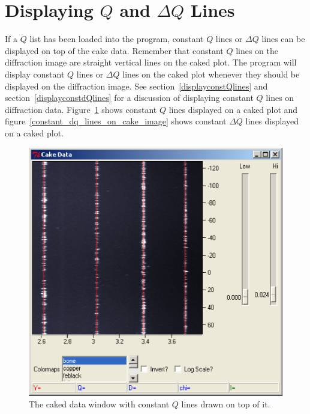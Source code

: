 \section{\texorpdfstring{Displaying $Q$ and $\Delta Q$ Lines}
    {Displaying Q and delta Q Lines}}
    \label{cakeQlinesandpeaks}

If a $Q$ list has been loaded into the program, 
constant $Q$ lines or $\Delta Q$ lines can be 
displayed on top of the cake data. Remember that 
constant $Q$ lines on the diffraction image are straight
vertical lines on the caked plot. 
The program will display constant $Q$ lines or 
$\Delta Q$ lines on the caked plot whenever they 
should be displayed on the diffraction image. See 
section~\ref{displayconstQlines} and 
section~\ref{displayconstdQlines} for a discussion of 
displaying constant $Q$ lines on diffraction data.
Figure~\ref{constant_q_lines_on_cake_image} shows constant
$Q$ lines displayed on a caked plot and 
figure~\ref{constant_dq_lines_on_cake_image} shows constant
$\Delta Q$ lines displayed on a caked plot.

\begin{figure}
    \centering
    \includegraphics[scale=.75]{figures/constant_q_lines_on_cake_image.eps}
    \caption{The caked data window with constant $Q$ 
    lines drawn on top of it.}
    \label{constant_q_lines_on_cake_image}
\end{figure}


